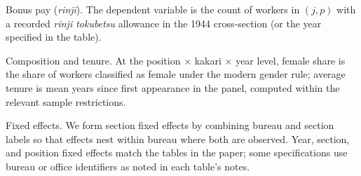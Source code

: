 Bonus pay (\emph{rinji}). The dependent variable is the count of workers in $(j,p)$ with a recorded \emph{rinji tokubetsu} allowance in the 1944 cross-section (or the year specified in the table).

Composition and tenure. At the position $\times$ kakari $\times$ year level, female share is the share of workers classified as female under the modern gender rule; average tenure is mean years since first appearance in the panel, computed within the relevant sample restrictions.

Fixed effects. We form section fixed effects by combining bureau and section labels so that effects nest within bureau where both are observed. Year, section, and position fixed effects match the tables in the paper; some specifications use bureau or office identifiers as noted in each table's notes.
